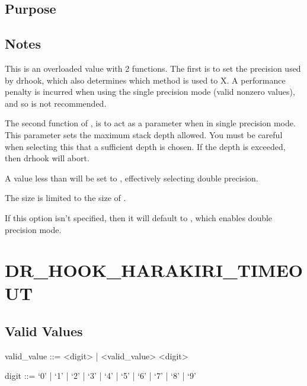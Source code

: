 \documentclass[letterpaper,10pt,english]{sphinxmanual}
\begin{document}
\subsection{Purpose}
\label{\detokenize{flag/flag:id141}}

\subsection{Notes}
\label{\detokenize{flag/flag:id143}}
\sphinxAtStartPar
This is an overloaded value with 2 functions. The first is to set the precision used by drhook, which also determines which method is used to X. A performance penalty is incurred when using the single precision mode (valid non\sphinxhyphen{}zero values), and so is not recommended.

\sphinxAtStartPar
The second function of , is to act as a parameter when in single precision mode. This parameter sets the maximum stack depth allowed. You must be careful when selecting this that a sufficient depth is chosen. If the depth is exceeded, then drhook will abort.

\sphinxAtStartPar
A value less than  will be set to , effectively selecting double precision.

\sphinxAtStartPar
The size is limited to the size of .

\sphinxAtStartPar
If this option isn’t specified, then it will default to , which enables double precision mode.


\section{DR\_HOOK\_HARAKIRI\_TIMEOUT}
\label{\detokenize{flag/flag:dr-hook-harakiri-timeout}}\label{\detokenize{flag/flag:id146}}

\subsection{Valid Values}
\label{\detokenize{flag/flag:id147}}
\begin{DUlineblock}{0em}
\item[] valid\_value ::= \textless{}digit\textgreater{} | \textless{}valid\_value\textgreater{} \textless{}digit\textgreater{}
\item[] digit ::= ‘0’ | ‘1’ | ‘2’ | ‘3’ | ‘4’ | ‘5’ | ‘6’ | ‘7’ | ‘8’ | ‘9’
\end{DUlineblock}
\end{document}
